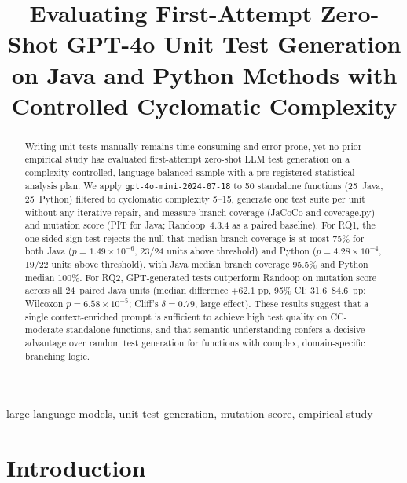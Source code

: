 \documentclass[conference]{IEEEtran}
\begin{document}
\title{Evaluating First-Attempt Zero-Shot GPT-4o Unit Test Generation on Java and Python Methods with Controlled Cyclomatic Complexity}

\author{
}

\maketitle

\begin{abstract}
Writing unit tests manually remains time-consuming and error-prone, yet no prior
empirical study has evaluated first-attempt zero-shot LLM test generation on a
complexity-controlled, language-balanced sample with a pre-registered statistical
analysis plan.
We apply \texttt{gpt-4o-mini-2024-07-18} to 50 standalone functions (25~Java,
25~Python) filtered to cyclomatic complexity 5--15, generate one test suite per
unit without any iterative repair, and measure branch coverage (JaCoCo and
coverage.py) and mutation score (PIT for Java; Randoop~4.3.4 as a paired baseline).
For RQ1, the one-sided sign test rejects the null that median branch coverage is
at most 75\% for both Java ($p = 1.49 \times 10^{-6}$, 23/24 units above
threshold) and Python ($p = 4.28 \times 10^{-4}$, 19/22 units above threshold),
with Java median branch coverage 95.5\% and Python median 100\%.
For RQ2, GPT-generated tests outperform Randoop on mutation score across all
24~paired Java units (median difference $+62.1$ pp, 95\% CI: 31.6--84.6~pp;
Wilcoxon $p = 6.58 \times 10^{-5}$; Cliff's $\delta = 0.79$, large effect).
These results suggest that a single context-enriched prompt is sufficient to
achieve high test quality on CC-moderate standalone functions, and that semantic
understanding confers a decisive advantage over random test generation for
functions with complex, domain-specific branching logic.
\end{abstract}

\begin{IEEEkeywords}
large language models, unit test generation, mutation score, empirical study
\end{IEEEkeywords}

\section{Introduction}
\label{sec:introduction}
\end{document}

